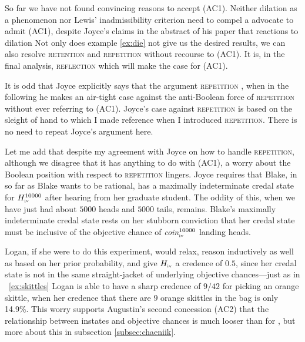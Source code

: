 \documentclass[phd,12pt,oneside]{ubcthesis}
\begin{document}
So far we have not found convincing reasons to accept (AC1). Neither
dilation as a phenomenon nor Lewis' inadmissibility criterion need to
compel a {\anderson} advocate to admit (AC1), despite Joyce's claims
in the abstract of his paper that reactions to dilation  Not only does example
\ref{ex:die} not give us the desired results, we can also resolve
\textsc{retention} and \textsc{repetition} without recourse to (AC1).
It is, in the final analysis, \textsc{reflection} which will make the
case for (AC1).

It is odd that Joyce explicitly says that the argument
\textsc{repetition}  , when in the
following he makes an air-tight case against the anti-Boolean force of
\textsc{repetition} without ever referring to (AC1). Joyce's case
against \textsc{repetition} is based on the sleight of hand to which I
made reference when I introduced \textsc{repetition}. There is no need
to repeat Joyce's argument here.

Let me add that despite my agreement with Joyce on how to handle
\textsc{repetition}, although we disagree that it has anything to do
with (AC1), a worry about the Boolean position with respect to
\textsc{repetition} lingers. Joyce requires that Blake, in so far as
Blake wants to be rational, has a maximally indeterminate credal state
for $H^{10000}_{\mbox{\tiny{iv}}}$ after hearing from her graduate
student. The oddity of this, when we have just had about $5000$ heads
and $5000$ tails, remains. Blake's maximally indeterminate credal
state rests on her stubborn conviction that her credal state must be
inclusive of the objective chance of
\textit{coin}$^{10000}_{\mbox{\tiny{iv}}}$ landing heads.

Logan, if she were to do this experiment, would relax, reason
inductively as well as based on her prior probability, and give
$H_{\mbox{\tiny{iv}}}$ a credence of $0.5$, since her credal state is
not in the same straight-jacket of underlying objective chances---just
as in {\xample}~\ref{ex:skittles} Logan is able to have a sharp
credence of $9/42$ for picking an orange skittle, when her credence
that there are $9$ orange skittles in the bag is only 14.9\%. This
worry supports Augustin's second concession (AC2) that the
relationship between instates and objective chances is much looser
than for {\anderson}, but more about this in subsection
\ref{subsec:chaeniik}.
\end{document}
